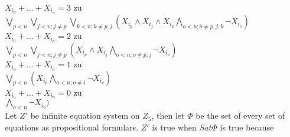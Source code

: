 $X_{i_0} + \ldots + X_{i_n} = 3$ zu \\
$\bigvee_{p<n} \bigvee_{j<n;  j\neq p} \bigvee_{k<n;  k\neq p,j} (X_{i_p} \wedge X_{i_j} \wedge X_{i_k} \bigwedge_{o<n;  o\neq p,j,k} \neg X_{i_o} )$\\

$X_{i_0} + \ldots + X_{i_n} = 2$ zu \\
$\bigvee_{p<n} \bigvee_{j<n;  j\neq p}  (X_{i_p} \wedge X_{i_j} \bigwedge_{o<n;  o\neq p,j} \neg X_{i_o} )$\\

$X_{i_0} + \ldots + X_{i_n} =1$ zu \\
$\bigvee_{p<n} (X_{i_p} \bigwedge_{o<n;  o\neq i} \neg X_{i_o} )$\\

$X_{i_0} + \ldots + X_{i_n} = 0$ zu \\
$ \bigwedge_{o<n} \neg X_{i_o} )$\\

Let $Z'$ be infinite equation system on $Z_5$, then let $\Phi$ be the set of every set of equations as propositional formulars. $Z'$ is true when $Sat\Phi$ is true because 
